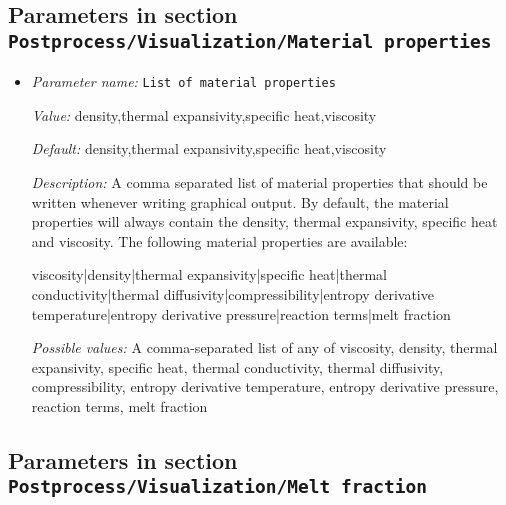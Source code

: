 \subsection{Parameters in section \tt Postprocess/Visualization/Material properties}
\label{parameters:Postprocess/Visualization/Material_20properties}

\begin{itemize}
\item {\it Parameter name:} {\tt List of material properties}
\label{parameters:Postprocess/Visualization/Material properties/List of material properties}


{\it Value:} density,thermal expansivity,specific heat,viscosity


{\it Default:} density,thermal expansivity,specific heat,viscosity


{\it Description:} A comma separated list of material properties that should be written whenever writing graphical output. By default, the material properties will always contain the density, thermal expansivity, specific heat and viscosity. The following material properties are available:

viscosity|density|thermal expansivity|specific heat|thermal conductivity|thermal diffusivity|compressibility|entropy derivative temperature|entropy derivative pressure|reaction terms|melt fraction


{\it Possible values:} A comma-separated list of any of viscosity, density, thermal expansivity, specific heat, thermal conductivity, thermal diffusivity, compressibility, entropy derivative temperature, entropy derivative pressure, reaction terms, melt fraction
\end{itemize}

\subsection{Parameters in section \tt Postprocess/Visualization/Melt fraction}
\label{parameters:Postprocess/Visualization/Melt_20fraction}

